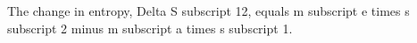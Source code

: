 The change in entropy, Delta S subscript 12, equals m subscript e times s subscript 2 minus m subscript a times s subscript 1.